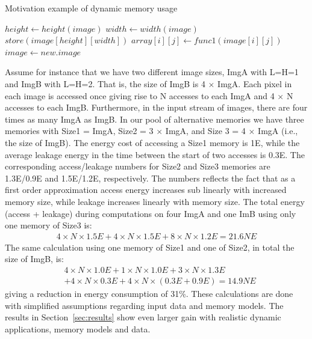 \documentclass[smallcondensed]{svjour3}
\begin{document}
\begin{algorithm}
\caption{Motivation example of dynamic memory usage}
 \label{alg:motivation}
 \begin{algorithmic}[1]
		\STATE $height \gets height(image)$
		\STATE $width \gets width(image)$
		\STATE $store(image[height][width])$
					\STATE $array[i][j] \gets func1(image[i][j])$
				\ENDFOR
			\ENDFOR
		\STATE $image \gets new.image$	
	\ENDWHILE
 \end{algorithmic}
\end{algorithm}

Assume for instance that we have two different image sizes, ImgA with L=H=1 and ImgB with L=H=2. 
That is, the size of ImgB is 4 $\times$ ImgA. 
Each pixel in each image is accessed once giving rise to N accesses to each ImgA and 4 $\times$ N accesses to each ImgB. 
Furthermore, in the input stream of images, there are four times as many ImgA as ImgB. 
In our pool of alternative memories we have three memories with Size1 = ImgA, Size2  = 3 $\times$ ImgA, and Size 3 = 4 $\times$ ImgA (i.e., the size of ImgB). 
The energy cost of accessing a Size1 memory is 1E, while the average leakage energy in the time between the start of two accesses is 0.3E. 
The corresponding access/leakage numbers for Size2 and Size3 memories are 1.3E/0.9E and 1.5E/1.2E, respectively. 
The numbers reflects the fact that as a first order approximation access energy increases sub linearly with increased memory size, while leakage increases linearly with memory size. 
The total energy (access + leakage) during computations on four ImgA and one ImB using only one memory of Size3 is:
\begin{align*}
4 \times N \times 1.5E + 4 \times N \times 1.5E + 8 \times N \times 1.2E = 21.6NE
\end{align*}
The same calculation using one memory of Size1 and one of Size2, in total the size of ImgB, is: 
\begin{align*}
& 4 \times N \times 1.0E + 1 \times N \times 1.0E + 3 \times N \times 1.3E \\
& + 4 \times N \times 0.3E + 4 \times N \times (0.3E + 0.9E) =  14.9NE
\end{align*}
giving a reduction in energy consumption of 31\%. 
These calculations are done with simplified assumptions regarding input data and memory models. 
The results in Section~\ref{sec:results} show even larger gain with realistic dynamic applications, memory models and data.
\end{document}
